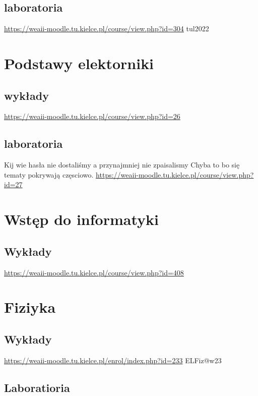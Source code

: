 \documentclass[11pt]{article}
\begin{document}
\subsection{laboratoria}
\label{sec:org8b2de46}
\url{https://weaii-moodle.tu.kielce.pl/course/view.php?id=304} tul2022
\section{Podstawy elektorniki}
\label{sec:orgb0f7d15}
\subsection{wykłady}
\label{sec:org991fed5}
\url{https://weaii-moodle.tu.kielce.pl/course/view.php?id=26}
\subsection{laboratoria}
\label{sec:org471294b}
Kij wie hasła nie dostaliśmy a przynajmniej nie zpaisalismy
Chyba to bo się tematy pokrywają częsciowo.
\url{https://weaii-moodle.tu.kielce.pl/course/view.php?id=27}
\section{Wstęp do informatyki}
\label{sec:orged7fcb4}
\subsection{Wykłady}
\label{sec:org7ee479d}
\url{https://weaii-moodle.tu.kielce.pl/course/view.php?id=408}
\section{Fiziyka}
\label{sec:org0c76c9a}
\subsection{Wykłady}
\label{sec:org1a82366}
\url{https://weaii-moodle.tu.kielce.pl/enrol/index.php?id=233} ELFiz@w23
\subsection{Laboratioria}
\label{sec:orgab43c02}
\end{document}
